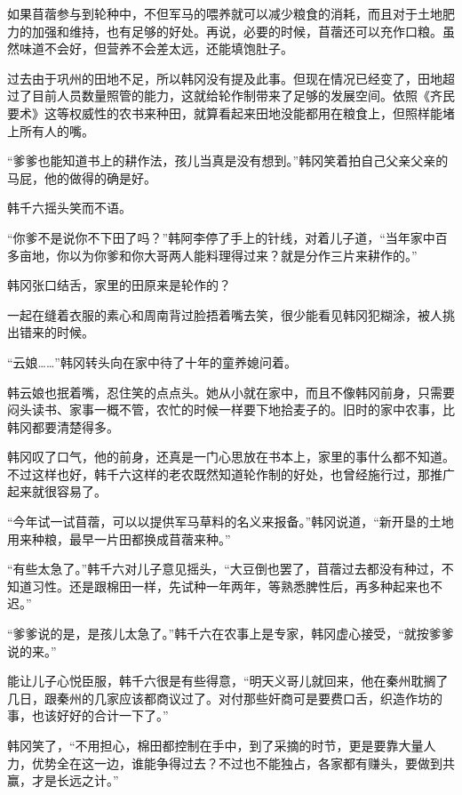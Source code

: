 如果苜蓿参与到轮种中，不但军马的喂养就可以减少粮食的消耗，而且对于土地肥力的加强和维持，也有足够的好处。再说，必要的时候，苜蓿还可以充作口粮。虽然味道不会好，但营养不会差太远，还能填饱肚子。

过去由于巩州的田地不足，所以韩冈没有提及此事。但现在情况已经变了，田地超过了目前人员数量照管的能力，这就给轮作制带来了足够的发展空间。依照《齐民要术》这等权威性的农书来种田，就算看起来田地没能都用在粮食上，但照样能堵上所有人的嘴。

“爹爹也能知道书上的耕作法，孩儿当真是没有想到。”韩冈笑着拍自己父亲父亲的马屁，他的做得的确是好。

韩千六摇头笑而不语。

“你爹不是说你不下田了吗？”韩阿李停了手上的针线，对着儿子道，“当年家中百多亩地，你以为你爹和你大哥两人能料理得过来？就是分作三片来耕作的。”

韩冈张口结舌，家里的田原来是轮作的？

一起在缝着衣服的素心和周南背过脸捂着嘴去笑，很少能看见韩冈犯糊涂，被人挑出错来的时候。

“云娘……”韩冈转头向在家中待了十年的童养媳问着。

韩云娘也抿着嘴，忍住笑的点点头。她从小就在家中，而且不像韩冈前身，只需要闷头读书、家事一概不管，农忙的时候一样要下地拾麦子的。旧时的家中农事，比韩冈都要清楚得多。

韩冈叹了口气，他的前身，还真是一门心思放在书本上，家里的事什么都不知道。不过这样也好，韩千六这样的老农既然知道轮作制的好处，也曾经施行过，那推广起来就很容易了。

“今年试一试苜蓿，可以以提供军马草料的名义来报备。”韩冈说道，“新开垦的土地用来种粮，最早一片田都换成苜蓿来种。”

“有些太急了。”韩千六对儿子意见摇头，“大豆倒也罢了，苜蓿过去都没有种过，不知道习性。还是跟棉田一样，先试种一年两年，等熟悉脾性后，再多种起来也不迟。”

“爹爹说的是，是孩儿太急了。”韩千六在农事上是专家，韩冈虚心接受，“就按爹爹说的来。”

能让儿子心悦臣服，韩千六很是有些得意，“明天义哥儿就回来，他在秦州耽搁了几日，跟秦州的几家应该都商议过了。对付那些奸商可是要费口舌，织造作坊的事，也该好好的合计一下了。”

韩冈笑了，“不用担心，棉田都控制在手中，到了采摘的时节，更是要靠大量人力，优势全在这一边，谁能争得过去？不过也不能独占，各家都有赚头，要做到共赢，才是长远之计。”

